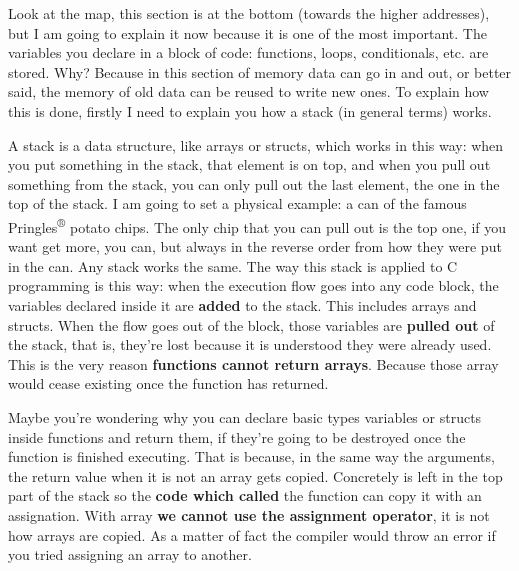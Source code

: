 \documentclass[a4paper]{article}
\begin{document}
Look at the map, this section is at the bottom (towards the higher addresses),
but I am going to explain it now because it is one of the most important. The
variables you declare in a block of code: functions, loops, conditionals, etc.
are stored. Why? Because in this section of memory data can go in and out, or
better said, the memory of old data can be reused to write new ones. To explain
how this is done, firstly I need to explain you how a stack (in general terms)
works.

A stack is a data structure, like arrays or structs, which works in this way:
when you put something in the stack, that element is on top, and when you pull
out something from the stack, you can only pull out the last element, the one
in the top of the stack. I am going to set a physical example: a can of the
famous Pringles\textsuperscript{®} potato chips. The only chip that you can
pull out is the top one, if you want get more, you can, but always in the
reverse order from how they were put in the can. Any stack works the same. The
way this stack is applied to C programming is this way: when the execution flow
goes into any code block, the variables declared inside it are \textbf{added}
to the stack. This includes arrays and structs. When the flow goes out of the
block, those variables are \textbf{pulled out} of the stack, that is, they're
lost because it is understood they were already used. This is the very reason
\textbf{functions cannot return arrays}. Because those array would cease
existing once the function has returned.

Maybe you're wondering why you can declare basic types variables or structs
inside functions and return them, if they're going to be destroyed once the
function is finished executing. That is because, in the same way the arguments,
the return value when it is not an array gets copied. Concretely is left in the
top part of the stack so the \textbf{code which called} the function can
copy it with an assignation. With array \textbf{we cannot use the assignment
operator}, it is not how arrays are copied. As a matter of fact the compiler
would throw an error if you tried assigning an array to another.
\end{document}
